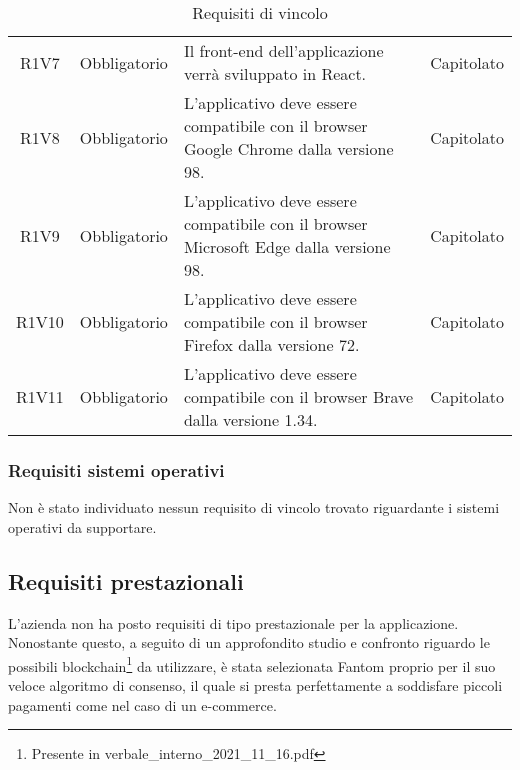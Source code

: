\begin{table}[H]
\begin{tabular}{c | c | p{6cm} | c}
        R1V7                                                              & Obbligatorio & Il front-end\glo{} dell'applicazione verrà sviluppato in React\glo{}.                                         & Capitolato               \\
        R1V8                                                              & Obbligatorio & L'applicativo deve essere compatibile con il browser Google Chrome\glo{} dalla versione 98.                   & Capitolato               \\
        R1V9                                                              & Obbligatorio & L'applicativo deve essere compatibile con il browser Microsoft Edge\glo{} dalla versione 98.                  & Capitolato               \\
        R1V10                                                             & Obbligatorio & L'applicativo deve essere compatibile con il browser Firefox\glo{} dalla versione 72.                         & Capitolato               \\
        R1V11                                                             & Obbligatorio & L'applicativo deve essere compatibile con il browser Brave\glo{} dalla versione 1.34.                         & Capitolato               \\
    \end{tabular}
    \caption{Requisiti di vincolo}
\end{table}

\subsubsection{Requisiti sistemi operativi}

Non è stato individuato nessun requisito di vincolo trovato riguardante i sistemi operativi da supportare.

\subsection{Requisiti prestazionali} \label{subsection:requisiti_prestazionali}

L'azienda non ha posto requisiti di tipo prestazionale per la applicazione.
Nonostante questo, a seguito di un approfondito studio e confronto riguardo le possibili blockchain\footnote{Presente in verbale\_interno\_2021\_11\_16.pdf} da utilizzare, è stata selezionata Fantom\glo{} proprio per il suo veloce algoritmo di consenso, il quale si presta perfettamente a soddisfare piccoli pagamenti
come nel caso di un e-commerce\glo{}.

